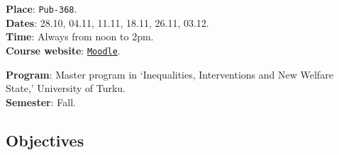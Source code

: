 \documentclass[letterpaper]{article}
\begin{document}
{\bf Place}: \texttt{Pub-368}.\\
{\bf Dates}: 28.10, 04.11, 11.11, 18.11, 26.11, 03.12.\\
{\bf Time}: Always from noon to 2pm.\\

{\bf Course website}: \href{https://moodle.utu.fi/course/view.php?id=26195}{\texttt{Moodle}}.




{\bf Program}: Master program in `Inequalities, Interventions and New Welfare State,' University of Turku.\\
{\bf Semester}: Fall.\\





\subsection*{Objectives}

\end{document}
